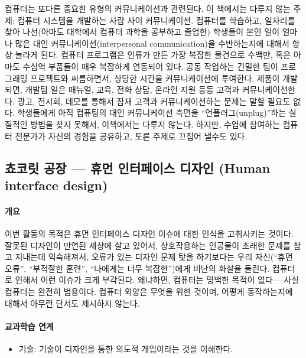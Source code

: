 \documentclass[]{article}
\begin{document}
컴퓨터는 또다른 중요한 유형의 커뮤니케이션과 관련된다. 이 책에서는
다루지 않는 주제: 컴퓨터 시스템을 개발하는 사람 사이 커뮤니케이션.
컴퓨터를 학습하고, 일자리를 찾아 나선(아마도 대학에서 컴퓨터 과학을
공부하고 졸업한) 학생들이 본인 일이 얼마나 많은 대인
커뮤니케이션(interpersonal communication)을 수반하는지에 대해서 항상
놀라게 된다. 컴퓨터 프로그램은 인류가 만든 가장 복잡한 물건으로 수백만,
혹은 아마도 수십억 부품들이 매우 복잡하게 연동되어 있다. 공동 작업하는
긴밀한 팀이 프로그래밍 프로젝트와 씨름하면서, 상당한 시간을
커뮤니케이션에 투여한다. 제품이 개발되면, 개발팀 일은 매뉴얼, 교육, 전화
상담, 온라인 지원 등등 고객과 커뮤니케이션한다. 광고, 전시회, 데모를
통해서 잠재 고객과 커뮤니케이션하는 문제는 말할 필요도 없다. 학생들에게
아직 컴퓨팅의 대인 커뮤니케이션 측면을 ``언플러그(unplug)''하는 실질적인
방법을 찾지 못해서, 이책에서는 다루지 않는다. 하지만, 수업에 참여하는
컴퓨터 전문가가 자신의 경험을 공유하고, 토론 주제로 끄집어 낼수도 있다.

\subsection{쵸코릿 공장 --- 휴먼 인터페이스 디자인 (Human interface
design)}\label{mdash----human-interface-design}

\mbox{}\paragraph{개요}\label{section-258}

이번 활동의 목적은 휴먼 인터페이스 디자인 이슈에 대한 인식을 고취시키는
것이다. 잘못된 디자인이 만연된 세상에 살고 있어서, 상호작용하는 인공물이
초래한 문제를 참고 지내는데 익숙해져서, 오류가 있는 디자인 문제 탓을
하기보다는 우리 자신(``휴먼 오류'', ``부적잘한 훈련'', ``나에게는 너무
복잡한'')에게 비난의 화살을 돌린다. 컴퓨터로 인해서 이런 이슈가 크게
부각된다. 왜냐하면, 컴퓨터는 명백한 목적이 없다--- 사실 컴퓨터는 완전히
범용이다. 컴퓨터 외양은 무엇을 위한 것이며, 어떻게 동작하는지에 대해서
아무런 단서도 제시하지 않는다.

\mbox{}\paragraph{교과학습 연계}\label{section-259}

\begin{itemize}
\itemsep1pt\parskip0pt
\item
  기술: 기술이 디자인을 통한 의도적 개입이라는 것을 이해한다.
\end{itemize}
\end{document}
